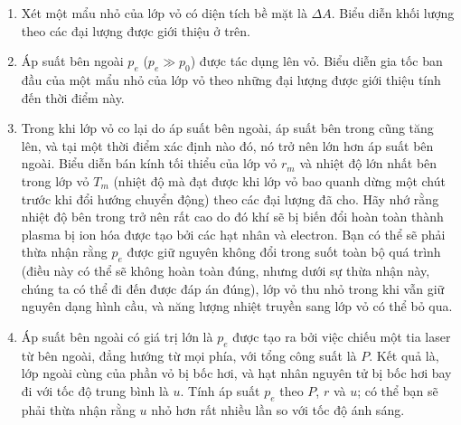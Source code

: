 \begin{vd}
\begin{enumerate}[{Phần }A.]
\begin{center}
\end{center}
\begin{enumerate}[1)]
\item Xét một mẩu nhỏ của lớp vỏ có diện tích bề mặt là $\Delta A$. Biểu diễn khối lượng theo các đại lượng được giới thiệu ở trên.
    \item Áp suất bên ngoài $p_{e}$ ($p_{e} \gg p_0$) được tác dụng lên vỏ. Biểu diễn gia tốc ban đầu của một mẩu nhỏ của lớp vỏ theo những đại lượng được giới thiệu tính đến thời điểm này.
    \item Trong khi lớp vỏ co lại do áp suất bên ngoài, áp suất bên trong cũng tăng lên, và tại một thời điểm xác định nào đó, nó trở nên lớn hơn áp suất bên ngoài. Biểu diễn bán kính tối thiểu của lớp vỏ $r_{m}$ và nhiệt độ lớn nhất bên trong lớp vỏ $T_m$ (nhiệt độ mà đạt được khi lớp vỏ bao quanh dừng một chút trước khi đổi hướng chuyển động) theo các đại lượng đã cho. Hãy nhớ rằng nhiệt độ bên trong trở nên rất cao do đó khí sẽ bị biến đổi hoàn toàn thành plasma bị ion hóa được tạo bởi các hạt nhân và electron. Bạn có thể sẽ phải thừa nhận rằng $p_{e}$ được giữ nguyên không đổi trong suốt toàn bộ quá trình (điều này có thể sẽ không hoàn toàn đúng, nhưng dưới sự thừa nhận này, chúng ta có thể đi đến được đáp án đúng), lớp vỏ thu nhỏ trong khi vẫn giữ nguyên dạng hình cầu, và năng lượng nhiệt truyền sang lớp vỏ có thể bỏ qua.
    \item Áp suất bên ngoài có giá trị lớn là $p_{e}$ được tạo ra bởi việc chiếu một tia laser từ bên ngoài, đẳng hướng từ mọi phía, với tổng công suất là $P$. Kết quả là, lớp ngoài cùng của phần vỏ bị bốc hơi, và hạt nhân nguyên tử bị bốc hơi bay đi với tốc độ trung bình là $u$. Tính áp suất $p_{e}$ theo $P$, $r$ và $u$; có thể bạn sẽ phải thừa nhận rằng $u$ nhỏ hơn rất nhiều lần so với tốc độ ánh sáng.
\end{enumerate}
\end{enumerate}
\end{vd}
